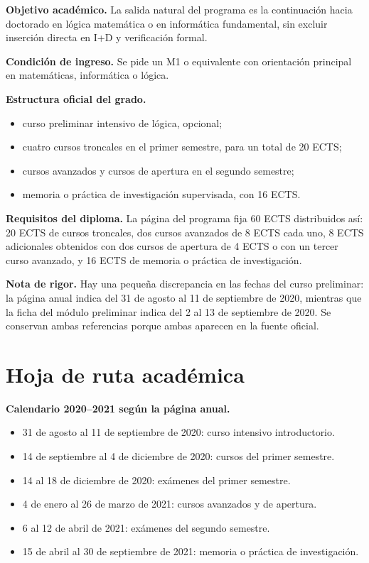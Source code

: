 \documentclass[a4paper,11pt]{article}
\begin{document}
\textbf{Objetivo académico.} La salida natural del programa es la continuación hacia doctorado en lógica matemática o en informática fundamental, sin excluir inserción directa en I+D y verificación formal.

\textbf{Condición de ingreso.} Se pide un M1 o equivalente con orientación principal en matemáticas, informática o lógica.

\textbf{Estructura oficial del grado.}
\begin{itemize}
\setlength{\itemsep}{0.2em}
\item curso preliminar intensivo de lógica, opcional;
\item cuatro cursos troncales en el primer semestre, para un total de 20 ECTS;
\item cursos avanzados y cursos de apertura en el segundo semestre;
\item memoria o práctica de investigación supervisada, con 16 ECTS.
\end{itemize}

\textbf{Requisitos del diploma.} La página del programa fija 60 ECTS distribuidos así: 20 ECTS de cursos troncales, dos cursos avanzados de 8 ECTS cada uno, 8 ECTS adicionales obtenidos con dos cursos de apertura de 4 ECTS o con un tercer curso avanzado, y 16 ECTS de memoria o práctica de investigación.

\textbf{Nota de rigor.} Hay una pequeña discrepancia en las fechas del curso preliminar: la página anual indica del 31 de agosto al 11 de septiembre de 2020, mientras que la ficha del módulo preliminar indica del 2 al 13 de septiembre de 2020. Se conservan ambas referencias porque ambas aparecen en la fuente oficial.

\section*{Hoja de ruta académica}

\textbf{Calendario 2020--2021 según la página anual.}
\begin{itemize}
\setlength{\itemsep}{0.2em}
\item 31 de agosto al 11 de septiembre de 2020: curso intensivo introductorio.
\item 14 de septiembre al 4 de diciembre de 2020: cursos del primer semestre.
\item 14 al 18 de diciembre de 2020: exámenes del primer semestre.
\item 4 de enero al 26 de marzo de 2021: cursos avanzados y de apertura.
\item 6 al 12 de abril de 2021: exámenes del segundo semestre.
\item 15 de abril al 30 de septiembre de 2021: memoria o práctica de investigación.
\end{itemize}
\end{document}
